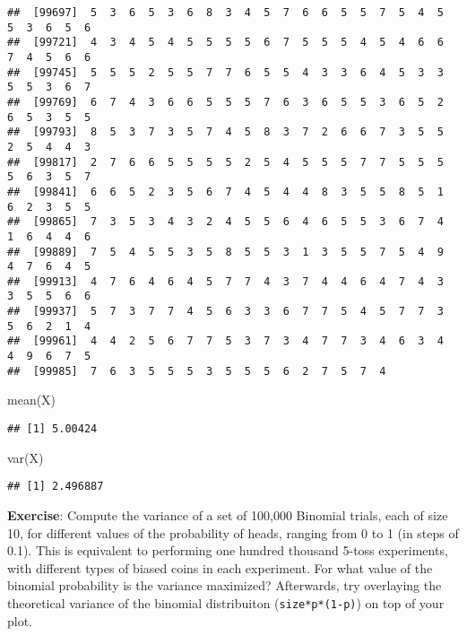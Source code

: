 \documentclass[
]{book}
\newenvironment{Shaded}{\begin{snugshade}}{\end{snugshade}}
\newcommand{\FunctionTok}[1]{\textcolor[rgb]{0.00,0.00,0.00}{#1}}
\newcommand{\NormalTok}[1]{#1}
\begin{document}
\begin{verbatim}
##  [99697]  5  3  6  5  3  6  8  3  4  5  7  6  6  5  5  7  5  4  5  5  3  6  5  6
##  [99721]  4  3  4  5  4  5  5  5  5  6  7  5  5  5  4  5  4  6  6  7  4  5  6  6
##  [99745]  5  5  5  2  5  5  7  7  6  5  5  4  3  3  6  4  5  3  3  5  5  3  6  7
##  [99769]  6  7  4  3  6  6  5  5  5  7  6  3  6  5  5  3  6  5  2  6  5  3  5  5
##  [99793]  8  5  3  7  3  5  7  4  5  8  3  7  2  6  6  7  3  5  5  2  5  4  4  3
##  [99817]  2  7  6  6  5  5  5  5  2  5  4  5  5  5  7  7  5  5  5  5  6  3  5  7
##  [99841]  6  6  5  2  3  5  6  7  4  5  4  4  8  3  5  5  8  5  1  6  2  3  5  5
##  [99865]  7  3  5  3  4  3  2  4  5  5  6  4  6  5  5  3  6  7  4  1  6  4  4  6
##  [99889]  7  5  4  5  5  3  5  8  5  5  3  1  3  5  5  7  5  4  9  4  7  6  4  5
##  [99913]  4  7  6  4  6  4  5  7  7  4  3  7  4  4  6  4  7  4  3  3  5  5  6  6
##  [99937]  5  7  3  7  7  4  5  6  3  3  6  7  7  5  4  5  7  7  3  5  6  2  1  4
##  [99961]  4  4  2  5  6  7  7  5  3  7  3  4  7  7  3  4  6  3  4  4  9  6  7  5
##  [99985]  7  6  3  5  5  5  3  5  5  5  6  2  7  5  7  4
\end{verbatim}

\begin{Shaded}
\begin{Highlighting}[]
\FunctionTok{mean}\NormalTok{(X)}
\end{Highlighting}
\end{Shaded}

\begin{verbatim}
## [1] 5.00424
\end{verbatim}

\begin{Shaded}
\begin{Highlighting}[]
\FunctionTok{var}\NormalTok{(X)}
\end{Highlighting}
\end{Shaded}

\begin{verbatim}
## [1] 2.496887
\end{verbatim}

\textbf{Exercise}: Compute the variance of a set of 100,000 Binomial trials, each of size 10, for different values of the probability of heads, ranging from 0 to 1 (in steps of 0.1). This is equivalent to performing one hundred thousand 5-toss experiments, with different types of biased coins in each experiment. For what value of the binomial probability is the variance maximized? Afterwards, try overlaying the theoretical variance of the binomial distribuiton (\texttt{size*p*(1-p)}) on top of your plot.
\end{document}
